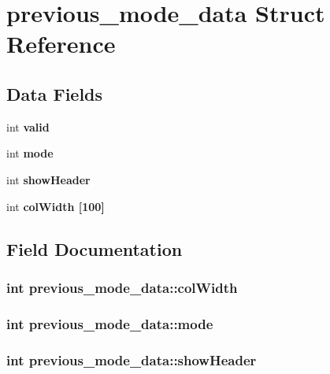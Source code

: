 \section{previous\_\-mode\_\-data Struct Reference}
\label{structprevious__mode__data}
\subsection*{Data Fields}
\begin{CompactItemize}
\item 
int \bf{valid}
\item 
int \bf{mode}
\item 
int \bf{show\-Header}
\item 
int \bf{col\-Width} [100]
\end{CompactItemize}


\subsection{Field Documentation}
\subsubsection{\setlength{\rightskip}{0pt plus 5cm}int \bf{previous\_\-mode\_\-data::col\-Width}}\label{structprevious__mode__data_34dec91f8ca2d5673a2b5d972d02a98f}


\subsubsection{\setlength{\rightskip}{0pt plus 5cm}int \bf{previous\_\-mode\_\-data::mode}}\label{structprevious__mode__data_8485ed3968309e6ba430235dadaedadc}


\subsubsection{\setlength{\rightskip}{0pt plus 5cm}int \bf{previous\_\-mode\_\-data::show\-Header}}\label{structprevious__mode__data_1f97a9b561734d481afdd3855fc2947e}


